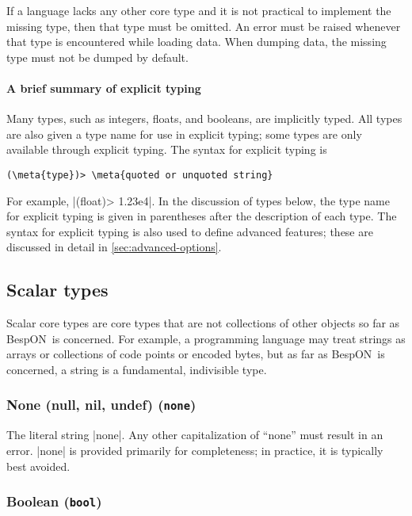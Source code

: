 \documentclass[11pt]{article}
\newcommand{\bespon}{BespON}
\newcommand{\meta}[1]{\ensuremath{\langle}\textit{#1}\ensuremath{\rangle}}
\begin{document}
If a language lacks any other core type and it is not practical to implement the missing type, then that type must be omitted.  An error must be raised whenever that type is encountered while loading data.  When dumping data, the missing type must not be dumped by default.


\paragraph{A brief summary of explicit typing}

Many types, such as integers, floats, and booleans, are implicitly typed.  All types are also given a type name for use in explicit typing; some types are only available through explicit typing.  The syntax for explicit typing is
\begin{Verbatim}[commandchars=\\\{\}]
(\meta{type})> \meta{quoted or unquoted string}
\end{Verbatim}
For example, |(float)> 1.23e4|.  In the discussion of types below, the type name for explicit typing is given in parentheses after the description of each type.  The syntax for explicit typing is also used to define advanced features; these are discussed in detail in \cref{sec:advanced-options}.


\subsection{Scalar types}

Scalar core types are core types that are not collections of other objects so far as \bespon\ is concerned.  For example, a programming language may treat strings as arrays or collections of code points or encoded bytes, but as far as \bespon\ is concerned, a string is a fundamental, indivisible type.


\subsubsection{None (null, nil, undef) (\texttt{none})}

The literal string |none|.  Any other capitalization of ``none'' must result in an error.  |none| is provided primarily for completeness; in practice, it is typically best avoided.


\subsubsection{Boolean (\texttt{bool})}
\end{document}
